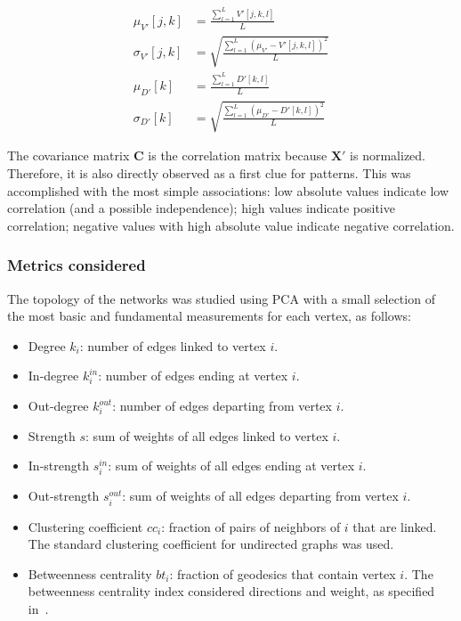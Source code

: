 \documentclass[%
	aip,
	jmp,%
	amsmath,amssymb,
	reprint,%
]{revtex4-1}
\begin{document}
\begin{align}\label{eq:pca}
\mu_{V'}[j,k]   &=\frac{\sum_{l=1}^L V'[j,k,l]}{L}\nonumber\\
\sigma_{V'}[j,k]&=\sqrt{\frac{\sum_{l=1}^L (\mu_{V'}-V'[j,k,l])^2}{L}}\\\nonumber
\mu_{D'}[k]&=\frac{\sum_{l=1}^L D'[k,l]}{L}\\\nonumber
\sigma_{D'}[k]&=\sqrt{\frac{\sum_{l=1}^L (\mu_{D'}-D'[k,l])^2}{L}}
\end{align}

The covariance matrix 
$\mathbf{C}$ is the correlation matrix because $\mathbf{X'}$ is normalized. Therefore, it is also directly observed as a first clue for patterns.
This was accomplished with the most simple associations:
low absolute values indicate low correlation (and a possible independence);
high values indicate positive correlation; negative values with high absolute value indicate negative correlation.

\subsubsection{Metrics considered}\label{measures}

The topology of the networks was studied using PCA with a small selection of the most basic and fundamental measurements for each vertex, as follows:

\begin{itemize}
	\item Degree     $k_i$: number of edges linked to vertex $i$.
	\item In-degree  $k_i^{in}$: number of edges ending at vertex $i$.
	\item Out-degree $k_i^{out}$: number of edges departing from vertex $i$.
	\item Strength $s$: sum of weights of all edges linked to vertex $i$.
	\item In-strength $s_i^{in}$: sum of weights of all edges ending at vertex $i$.
	\item Out-strength $s_i^{out}$: sum of weights of all edges departing from vertex $i$.
	\item Clustering coefficient $cc_i$: fraction of pairs of neighbors of $i$ that are linked.  The standard clustering coefficient for undirected graphs was used.
	\item Betweenness centrality $bt_i$: fraction of geodesics that contain vertex $i$. The betweenness centrality index considered directions and weight, as specified in~\cite{faster}.
\end{itemize}
\end{document}
